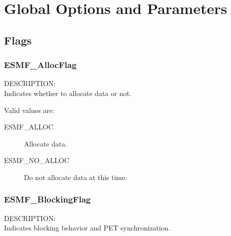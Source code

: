 
\section{Global Options and Parameters}

\subsection{Flags}

\subsubsection{ESMF\_AllocFlag}
\label{opt:allocflag}
{\sf DESCRIPTION:\\}  
Indicates whether to allocate data or not.

Valid values are:
\begin{description}
\item [ESMF\_ALLOC]
      Allocate data. 
\item [ESMF\_NO\_ALLOC]
      Do not allocate data at this time. 
\end{description}

\subsubsection{ESMF\_BlockingFlag}
\label{opt:blockingflag}
{\sf DESCRIPTION:\\}  
Indicates blocking behavior and PET synchronization.

